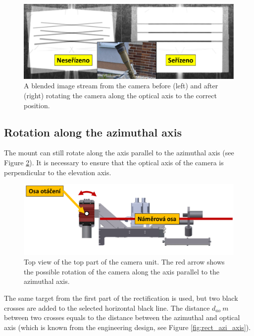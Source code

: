 \begin{figure}[htb]
	\centering
	\includegraphics[width=13cm]{fig/rect_mirrored_stream.png}
	\caption{A blended image stream from the camera before (left) and after (right) rotating the camera along the optical axis to the correct position.}
	\label{fig:rect_mirrored_stream}
\end{figure}

\subsection{Rotation along the azimuthal axis}

The mount can still rotate along the axis parallel to the azimuthal axis (see Figure \ref{fig:rect_model_top_view}). It is necessary to ensure that the optical axis of the camera is perpendicular to the elevation axis. 

\begin{figure}[htb]
	\centering
	\includegraphics[width=13cm]{fig/rect_model_top_view.png}
	\caption{Top view of the top part of the camera unit. The red arrow shows the possible rotation of the camera along the axis parallel to the azimuthal axis.}
	\label{fig:rect_model_top_view}
\end{figure}

The same target from the first part of the rectification is used, but two black crosses are added to the selected horizontal black line. The distance $d_{ao}\ m$ between two crosses equals to the distance between the azimuthal and optical axis (which is known from the engineering design, see Figure \ref{fig:rect_azi_axis}). 

